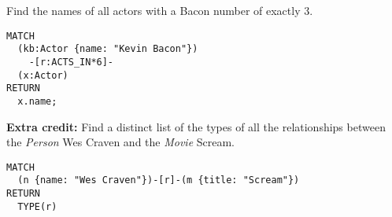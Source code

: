 \documentclass[a4paper, 12pt]{exam}
\begin{document}
\begin{questions}
\question
Find the names of all actors with a Bacon number of exactly 3.
\begin{solution}
  \begin{verbatim}
MATCH
  (kb:Actor {name: "Kevin Bacon"})
    -[r:ACTS_IN*6]-
  (x:Actor)
RETURN
  x.name;
  \end{verbatim}
\end{solution}

\question
\textbf{Extra credit:} Find a distinct list of the types of all the relationships between the \emph{Person} Wes Craven and the \emph{Movie} Scream.
\begin{solution}
  \begin{verbatim}
MATCH
  (n {name: "Wes Craven"})-[r]-(m {title: "Scream"})
RETURN
  TYPE(r)
  \end{verbatim}
\end{solution}



\end{questions}





\end{document}
